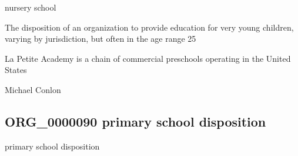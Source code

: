 \documentclass[letterpaper,10pt,english]{sphinxmanual}
\begin{document}
\begin{sphinxShadowBox}

\sphinxAtStartPar
nursery school
\end{sphinxShadowBox}

\begin{sphinxShadowBox}

\sphinxAtStartPar
{\hyperref[\detokenize{doc-BFO_0000016::doc}]{}}
\end{sphinxShadowBox}

\begin{sphinxShadowBox}

\sphinxAtStartPar
The disposition of an organization to provide education for very young children, varying by jurisdiction, but often in the age range 2\sphinxhyphen{}5
\end{sphinxShadowBox}

\begin{sphinxShadowBox}

\sphinxAtStartPar
{}
\end{sphinxShadowBox}

\begin{sphinxShadowBox}

\sphinxAtStartPar
La Petite Academy is a chain of commercial preschools operating in the United States
\end{sphinxShadowBox}

\begin{sphinxShadowBox}

\sphinxAtStartPar
Michael Conlon 
\end{sphinxShadowBox}
\begin{quote}

\ignorespaces \end{quote}


\subsection{ORG\_0000090 \sphinxhyphen{} primary school disposition}
\label{\detokenize{doc-ORG_0000090:org-0000090-primary-school-disposition}}\label{\detokenize{doc-ORG_0000090:index-0}}\label{\detokenize{doc-ORG_0000090::doc}}
\begin{sphinxShadowBox}

\sphinxAtStartPar
primary school disposition
\end{sphinxShadowBox}
\end{document}
